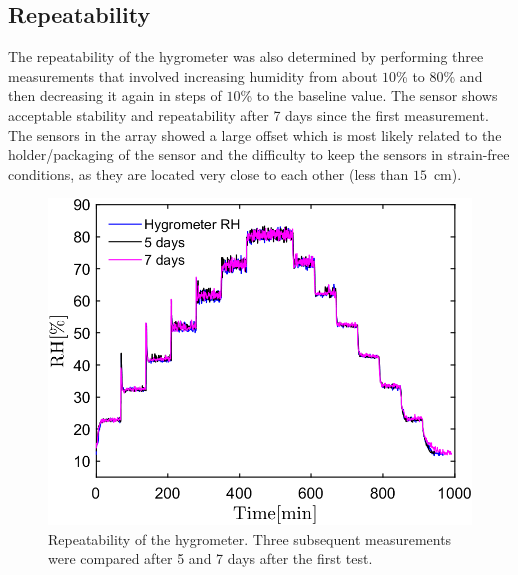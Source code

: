 \subsection{Repeatability}
The repeatability of the hygrometer was also determined by performing three measurements that involved increasing humidity from about $10$\% to $80$\% and then decreasing it again in steps of $10$\% to the baseline value. The sensor shows acceptable stability and repeatability after 7 days since the first measurement. The sensors in the array showed a large offset which is most likely related to the holder/packaging of the sensor and the difficulty to keep the sensors in strain-free conditions, as they are located very close to each other (less than $15$~cm).
\begin{figure}[!h]
\centering
\includegraphics[width=0.6\columnwidth]{Chapter5/images/repeat.png}
\caption{Repeatability of the hygrometer. Three subsequent measurements were compared after 5 and 7 days after the first test.}
\label{fig_repeatability}
\end{figure}




